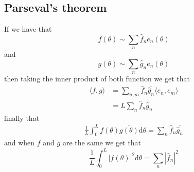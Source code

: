 \documentclass{article}
\begin{document}
\subsection{Parseval's theorem}
	If we have that \[f(\theta)\sim \sum_n\hat f_n e_n(\theta) \]
	and
	\[
	  g(\theta)\sim \sum_n\hat g_n e_n(\theta)
	\]
	then taking the inner product of both function we get that
	\begin{align*}
		\langle f,g\rangle &= \sum_{n,m}\hat f_n\overline{\hat g_n}\langle e_n,e_m\rangle\\
				   &= L\sum_n\hat f_n \overline{\hat g_n}
	\end{align*}
	finally that
	\begin{align*}
		\frac 1L\int_0^L f(\theta)\overline{g(\theta)}\mathrm d\theta=\sum_n \hat f_n \overline{\hat g_n}
	\end{align*}
	 and when $ f $ and $ g $ are the same we get that
	 \[
	   \frac 1L\int_0^L|f(\theta)|^2\mathrm d\theta=\sum_n|\hat f_n|^2
	 \]
\end{document}
